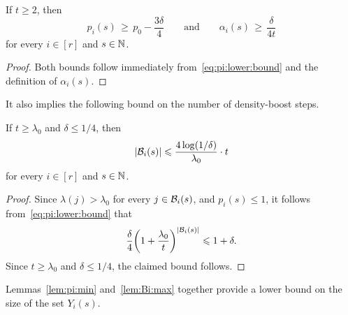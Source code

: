 \begin{lemma}
  \label{lem:pi:min} %
  If\/ $t \ge 2$, then 
  $$p_i(s) \, \ge \, p_0 - \frac{3\delta}{4} \qquad \text{and} \qquad \alpha_i(s) \, \ge \, \frac{\delta}{4t}$$
  for every $i \in [r]$ and $s \in \mathbb{N}$. 
\end{lemma}
%
\begin{proof}
  Both bounds follow immediately from~\eqref{eq:pi:lower:bound} and the definition of $\alpha_i(s)$. 
\end{proof}

It also implies the following bound on the number of density-boost steps. 


\begin{lemma}
  \label{lem:Bi:max} %
  If\/ $t \ge \lambda_0$ and\/ $\delta \le 1/4$, then
  $$|\mathcal{B}_i(s)| \leqslant \frac{4 \log(1/\delta)}{\lambda_0} \cdot t$$
  for every $i \in [r]$ and $s \in \mathbb{N}$. 
\end{lemma}
%
\begin{proof}
  Since $\lambda(j) > \lambda_0$ for every $j \in \mathcal{B}_i(s)$, and $p_i(s) \le 1$, it follows from~\eqref{eq:pi:lower:bound} that
  $$\frac{\delta}{4} \bigg( 1 + \frac{\lambda_0}{t} \bigg)^{|\mathcal{B}_i(s)|} \leqslant 1 + \delta.$$
  Since $t \ge \lambda_0$ and $\delta \le 1/4$, the claimed bound follows. 
\end{proof}

Lemmas~\ref{lem:pi:min} and~\ref{lem:Bi:max} together provide a lower bound on the size of the set $Y_i(s)$. 


